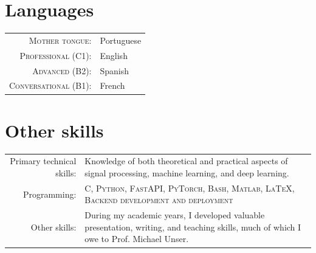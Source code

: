 \documentclass[a4paper,11pt]{article}
\begin{document}
    \vspace{15pt}

    \section{Languages}

      \begin{tabular}{rp{10cm}}

        \textsc{Mother tongue:} & Portuguese \\

        \textsc{Professional (C1):} & English \\

        \textsc{Advanced (B2):} & Spanish \\

        \textsc{Conversational (B1):} & French \\

      \end{tabular}


    \vspace{15pt}

    \section{Other skills}

    \begin{tabular}{rp{11cm}}
  	Primary technical skills:  & Knowledge of both theoretical and practical aspects of signal processing, machine learning, and deep learning.
    \vspace{5pt}\\
  	Programming:       &  \textsc{C, Python, FastAPI, PyTorch, Bash, Matlab, \LaTeX, Backend development and deployment}  \vspace{5pt} \\
  	Other skills: 	   & During my academic years, I developed valuable presentation, writing, and teaching skills, much of which I owe to Prof. Michael Unser.

    \end{tabular}

\end{document}

